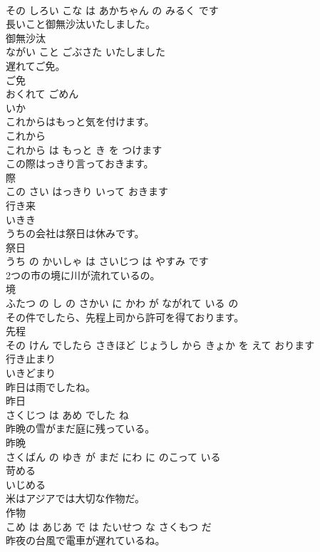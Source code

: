 \documentclass[8pt]{extreport}
\begin{document}
\begin{CJK}{UTF8}{min}
\\	その しろい こな は あかちゃん の みるく です			
\\	長いこと御無沙汰いたしました。	
\\	御無沙汰 
\\	ながい こと ごぶさた いたしました			
\\	遅れてご免。	
\\	ご免 
\\	おくれて ごめん			
\\	いか	
\\	これからはもっと気を付けます。	
\\	これから 
\\	これから は もっと き を つけます			
\\	この際はっきり言っておきます。	
\\	際 
\\	この さい はっきり いって おきます			
\\	行き来	
\\	いきき		
\\	うちの会社は祭日は休みです。	
\\	祭日 
\\	うち の かいしゃ は さいじつ は やすみ です			
\\	2つの市の境に川が流れているの。	
\\	境 
\\	ふたつ の し の さかい に かわ が ながれて いる の			
\\	その件でしたら、先程上司から許可を得ております。	
\\	先程 
\\	その けん でしたら さきほど じょうし から きょか を えて おります			
\\	行き止まり	
\\	いきどまり		
\\	昨日は雨でしたね。	
\\	昨日 
\\	さくじつ は あめ でした ね			
\\	昨晩の雪がまだ庭に残っている。	
\\	昨晩 
\\	さくばん の ゆき が まだ にわ に のこって いる			
\\	苛める	
\\	いじめる		
\\	米はアジアでは大切な作物だ。	
\\	作物 
\\	こめ は あじあ で は たいせつ な さくもつ だ			
\\	昨夜の台風で電車が遅れているね。	

\end{CJK}
\end{document}
